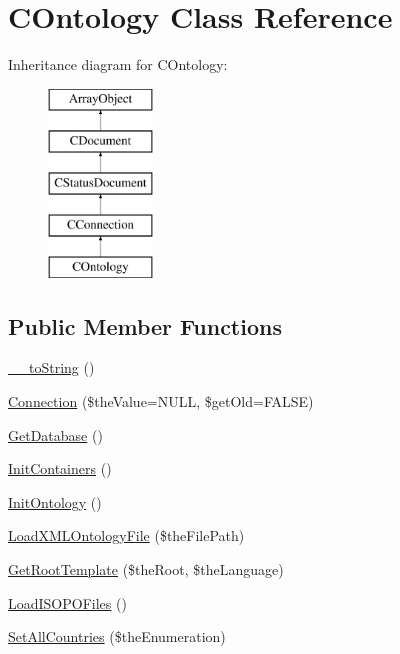 \hypertarget{class_c_ontology}{\section{C\-Ontology Class Reference}
\label{class_c_ontology}
}
Inheritance diagram for C\-Ontology\-:\begin{figure}[H]
\begin{center}
\leavevmode
\includegraphics[height=5.000000cm]{class_c_ontology}
\end{center}
\end{figure}
\subsection*{Public Member Functions}
\begin{DoxyCompactItemize}
\item 
\hyperlink{class_c_ontology_a3bf6307b3353401050f4e66822d4cecf}{\-\_\-\-\_\-to\-String} ()
\item 
\hyperlink{class_c_ontology_a1c7acc74d753c47dc89d46464afc0099}{Connection} (\$the\-Value=N\-U\-L\-L, \$get\-Old=F\-A\-L\-S\-E)
\item 
\hyperlink{class_c_ontology_ae8905b152a35d927137faeb2aa1885ce}{Get\-Database} ()
\item 
\hyperlink{class_c_ontology_a305fa41da58da8239b7636e0ffdc9689}{Init\-Containers} ()
\item 
\hyperlink{class_c_ontology_a6bfd3100a83783cf1997749bf901b8df}{Init\-Ontology} ()
\item 
\hyperlink{class_c_ontology_ad9b6ebbaf592ab0543be3f63cddd025c}{Load\-X\-M\-L\-Ontology\-File} (\$the\-File\-Path)
\item 
\hyperlink{class_c_ontology_a2c3e33bcf3316c66658eef0fd9f7a6a2}{Get\-Root\-Template} (\$the\-Root, \$the\-Language)
\item 
\hyperlink{class_c_ontology_a9789841620a6b75f09120223d7fd4dc8}{Load\-I\-S\-O\-P\-O\-Files} ()
\item 
\hyperlink{class_c_ontology_a85ac5a51432b48fe5c2fa81a6fae2c0a}{Set\-All\-Countries} (\$the\-Enumeration)
\end{DoxyCompactItemize}
